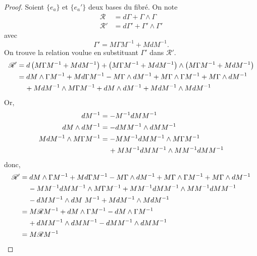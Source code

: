 \documentclass[a4paper,11pt]{report}
\theoremstyle{definition}
\theoremstyle{plain}
\theoremstyle{definition}
\theoremstyle{remark}
\begin{document}
                \begin{proof}
                    Soient $\{e_a\}$ et $\{e_a'\}$ deux bases du fibré. On note
                    \begin{align}
                        \mathscr{R} &= d\Gamma + \Gamma\wedge\Gamma \\
                        \mathscr{R}' &= d\Gamma' + \Gamma'\wedge\Gamma'
                    \end{align}
                    avec 
                    \begin{equation}
                        \Gamma' = M\Gamma M^{-1} + MdM^{-1}.
                    \end{equation}
                    On trouve la relation voulue en substituant $\Gamma'$ dans $\mathscr{R}'$.
                    \begin{align}
                        \mathscr{R}' &= d\left( M\Gamma M^{-1} + MdM^{-1} \right) + \left( M\Gamma M^{-1} + MdM^{-1} \right)\wedge\left( M\Gamma M^{-1} + MdM^{-1} \right) \\
                        &= dM\wedge\Gamma M^{-1}+Md\Gamma M^{-1}-M\Gamma\wedge dM^{-1}+M\Gamma\wedge\Gamma M^{-1} + M\Gamma\wedge dM^{-1} \\
                        &\hspace{0.4cm}+ MdM^{-1}\wedge M\Gamma M^{-1}+dM\wedge dM^{-1}+MdM^{-1}\wedge MdM^{-1}
                    \end{align}
                    Or,
                    \begin{align}
                        dM^{-1} &= -M^{-1}dMM^{-1}\\
                        dM\wedge dM^{-1} &= -dMM^{-1}\wedge dMM^{-1}\\
                        MdM^{-1}\wedge M\Gamma M^{-1} &= -MM^{-1}dMM^{-1}\wedge M\Gamma M^{-1}\\
                        &\hspace{0.4cm}+MM^{-1}dMM^{-1}\wedge MM^{-1}dMM^{-1}
                    \end{align}
                    donc,
                    \begin{align}
                        \mathscr{R}' &= dM\wedge\Gamma M^{-1}+Md\Gamma M^{-1}-M\Gamma\wedge dM^{-1}+M\Gamma\wedge\Gamma M^{-1} + M\Gamma\wedge dM^{-1} \\
                        &\hspace{0.4cm}-MM^{-1}dM M^{-1}\wedge M\Gamma M^{-1}+MM^{-1}dMM^{-1}\wedge MM^{-1}dMM^{-1}\\
                        &\hspace{0.4cm}-dMM^{-1}\wedge dM~ M^{-1}+MdM^{-1}\wedge MdM^{-1}\\
                        &= M\mathscr{R}M^{-1} + dM\wedge\Gamma M^{-1}-dM\wedge\Gamma M^{-1}\\
                        &\hspace{0.4cm}+ dMM^{-1}\wedge dMM^{-1}-dMM^{-1}\wedge dMM^{-1}\\
                        &= M\mathscr{R}M^{-1}
                    \end{align}
                \end{proof}
                
\end{document}
